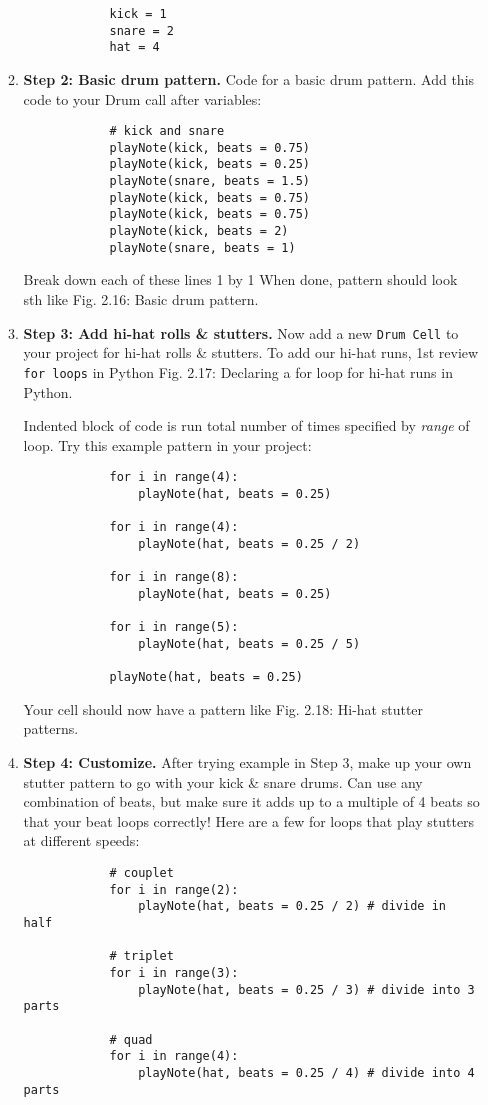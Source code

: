\documentclass{article}
\begin{document}
\begin{itemize}
\begin{enumerate}
\begin{verbatim}
			kick = 1
			snare = 2
			hat = 4
		\end{verbatim}
		\item {\bf Step 2: Basic drum pattern.} Code for a basic drum pattern. Add this code to your Drum call after variables:
		\begin{verbatim}
			# kick and snare
			playNote(kick, beats = 0.75)
			playNote(kick, beats = 0.25)
			playNote(snare, beats = 1.5)
			playNote(kick, beats = 0.75)
			playNote(kick, beats = 0.75)
			playNote(kick, beats = 2)
			playNote(snare, beats = 1)
		\end{verbatim}
		Break down each of these lines 1 by 1 {\sf[Table]} When done, pattern should look sth like {\sf Fig. 2.16: Basic drum pattern}.
		\item {\bf Step 3: Add hi-hat rolls \& stutters.} Now add a new {\tt Drum Cell} to your project for hi-hat rolls \& stutters. To add our hi-hat runs, 1st review {\tt for loops} in Python {\sf Fig. 2.17: Declaring a for loop for hi-hat runs in Python.}
		
		Indented block of code is run total number of times specified by {\it range} of loop. Try this example pattern in your project:
		\begin{verbatim}
			for i in range(4):
			    playNote(hat, beats = 0.25)
			    
			for i in range(4):
			    playNote(hat, beats = 0.25 / 2)
			    
			for i in range(8):
			    playNote(hat, beats = 0.25)
			    
			for i in range(5):
			    playNote(hat, beats = 0.25 / 5)
			
			playNote(hat, beats = 0.25)
		\end{verbatim}
		Your cell should now have a pattern like {\sf Fig. 2.18: Hi-hat stutter patterns.}
		\item {\bf Step 4: Customize.} After trying example in Step 3, make up your own stutter pattern to go with your kick \& snare drums. Can use any combination of beats, but make sure it adds up to a multiple of 4 beats so that your beat loops correctly! Here are a few for loops that play stutters at different speeds:
		\begin{verbatim}
			# couplet
			for i in range(2):
			    playNote(hat, beats = 0.25 / 2) # divide in half
			    
			# triplet
			for i in range(3):
			    playNote(hat, beats = 0.25 / 3) # divide into 3 parts
			    
			# quad
			for i in range(4):
			    playNote(hat, beats = 0.25 / 4) # divide into 4 parts
			    

\end{verbatim}
\end{enumerate}
\end{itemize}
\end{document}
